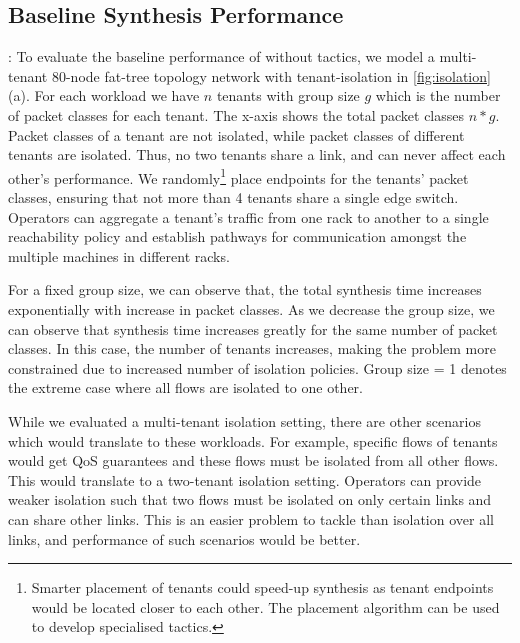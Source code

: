 \subsection{Baseline Synthesis Performance} \label{sec:baselineeval} 
: To evaluate the baseline performance of \Name without tactics, we model a multi-tenant
80-node fat-tree topology network with   
tenant-isolation in \cref{fig:isolation}(a). 
For each workload we have $n$ tenants with group size $g$ which 
is the number of packet classes for each tenant. The x-axis shows the total packet classes $n*g$. 
Packet classes of a tenant are not isolated, while packet classes
of different tenants are isolated. Thus, no two tenants share a link, and can never affect
each other's performance.
We randomly\footnote{
	Smarter placement of tenants could speed-up synthesis as tenant endpoints would
	be located closer to each other. The placement algorithm can be used to develop specialised tactics.}
  place endpoints for the tenants' packet classes, ensuring that not more than 4 tenants share a single edge switch.
   Operators can aggregate a tenant's traffic from one rack to
another to a single reachability policy and establish pathways for communication amongst the multiple
machines in different racks. 

For a fixed group size, we can observe that,
the total synthesis time increases exponentially with increase in packet classes.
 As we decrease the group size,
 we can observe that synthesis time increases greatly for the same number of packet classes.
 In this case, the number of tenants increases, making the problem more constrained 
  due to increased number of isolation policies. 
 Group size = 1 denotes the extreme case where all flows are isolated to one other. 
 
 While we evaluated a multi-tenant isolation setting, there are other scenarios
 which would translate to these workloads. For example, specific flows of 
 tenants would get QoS guarantees and these flows must be isolated from all
 other flows. This would translate to a two-tenant isolation setting. Operators 
 can provide weaker isolation such that two flows must be isolated on only certain 
 links and can share other links. This is an easier problem to tackle than isolation over
 all links, and performance of such scenarios would be better.

